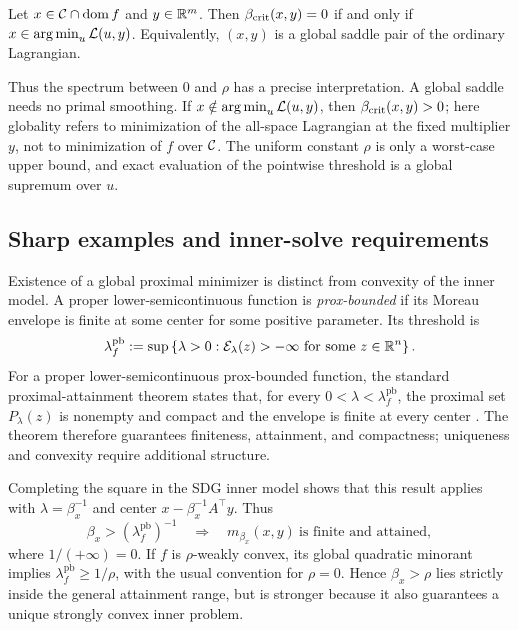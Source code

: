 \begin{corollary}
  Let \(x\in\mathcal{C}\cap\operatorname{dom}f\) and \(y\in\mathbb{R}^m\).  Then
  \(\beta_{\mathrm{crit}}(x,y)=0\) if and only if
  \(x\in\operatorname*{arg\,min}_u\mathcal{L}(u,y)\).  Equivalently, \((x,y)\) is a global saddle
  pair of the ordinary Lagrangian.
\end{corollary}

Thus the spectrum between \(0\) and \(\rho\) has a precise interpretation.
A global saddle needs no primal smoothing.  If
\(x\notin\operatorname*{arg\,min}_u\mathcal{L}(u,y)\), then
\(\beta_{\mathrm{crit}}(x,y)>0\); here globality refers to minimization of the
all-space Lagrangian at the fixed multiplier \(y\), not to minimization of
\(f\) over \(\mathcal{C}\).  The uniform constant \(\rho\) is only a worst-case
upper bound, and exact evaluation of the pointwise threshold is a global
supremum over \(u\).

\subsection{Sharp examples and inner-solve requirements}

Existence of a global proximal minimizer is distinct from convexity of the
inner model.  A proper lower-semicontinuous function is
\emph{prox-bounded} if its Moreau envelope is finite at some center for some
positive parameter.  Its threshold is
\begin{equation}
  \lambda_f^{\mathrm{pb}}
  :=
  \sup\left\{
    \lambda>0:
    \mathcal{E}_\lambda(z)>-\infty
    \ \text{for some }z\in\mathbb{R}^n
  \right\}.
  \label{eq:prox-boundedness-threshold}
\end{equation}
For a proper lower-semicontinuous prox-bounded function, the standard
proximal-attainment theorem states that, for every
\(0<\lambda<\lambda_f^{\mathrm{pb}}\), the proximal set \(P_\lambda(z)\)
is nonempty and compact and the envelope is finite at every center
\citep[Definition~1.23 and Theorem~1.25]{RockafellarWets1998}.  The theorem
therefore guarantees finiteness, attainment, and compactness; uniqueness and
convexity require additional structure.

Completing the square in the SDG inner model shows that this result applies
with \(\lambda=\beta_x^{-1}\) and center
\(x-\beta_x^{-1}A^\top y\).  Thus
\begin{equation}
  \beta_x>\left(\lambda_f^{\mathrm{pb}}\right)^{-1}
  \quad\Longrightarrow\quad
  m_{\beta_x}(x,y)\ \text{is finite and attained},
  \label{eq:prox-boundedness-attainment}
\end{equation}
where \(1/(+\infty)=0\).  If \(f\) is \(\rho\)-weakly convex, its global
quadratic minorant implies
\(\lambda_f^{\mathrm{pb}}\ge1/\rho\), with the usual convention for
\(\rho=0\).  Hence \(\beta_x>\rho\) lies strictly inside the general
attainment range, but is stronger because it also guarantees a unique
strongly convex inner problem.

